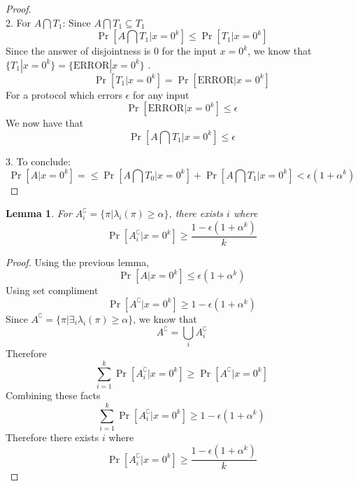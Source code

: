\documentclass{article}
\theoremstyle{plain}
\newtheorem{lemma}[theorem]{Lemma}
\begin{document}
\begin{proof}
\begin{equation*}
\end{equation*}
2. For $A \bigcap T_1$: \newline
Since $A \bigcap T_1 \subseteq T_1$
\begin{equation*}
    \Pr[A \bigcap T_1 | x = 0^k] \leq \Pr[T_1 | x = 0^k]
\end{equation*}
Since the answer of disjointness is 0 for the input $x=0^k$, we know that $\{T_1 | x=0^k\} = \{\text{ERROR} | x=0^k\}$ .
\begin{equation*}
    \Pr[T_1 | x = 0^k] = \Pr[\text{ERROR} | x = 0^k]
\end{equation*}
For a protocol which errors $\epsilon$ for any input
\begin{equation*}
    \Pr[\text{ERROR} | x = 0^k] \leq \epsilon
\end{equation*}
We now have that 
\begin{equation*}
    \Pr[A \bigcap T_1 | x = 0^k] \leq \epsilon
\end{equation*}

3. To conclude: \newline
\begin{equation*}
    \Pr[A| x = 0^k] = \leq \Pr[A \bigcap T_0 | x = 0^k] + \Pr[A \bigcap T_1 | x = 0^k] < \epsilon (1 + \alpha ^k)
\end{equation*}
\end{proof}

\begin{lemma}
    For $A_{i}^\complement = \{\pi | \lambda_i(\pi) \geq \alpha\}$, there exists $i$ where
    \begin{equation*}
    \Pr[A_{i}^\complement| x = 0^k] \geq \frac{1 - \epsilon (1 + \alpha ^k)}{k}
    \end{equation*}
\end{lemma}
\begin{proof}
Using the previous lemma,
\begin{equation*}
    \Pr[A| x = 0^k] \leq \epsilon (1 + \alpha ^k)
\end{equation*}
Using set compliment
\begin{equation*}
    \Pr[A^\complement| x = 0^k] \geq 1 - \epsilon (1 + \alpha ^k)
\end{equation*}
Since $A^\complement = \{\pi | \exists_i \lambda_i(\pi) \geq \alpha\}$, we know that 
\begin{equation*}
    A^\complement = \bigcup_{i} A_{i}^\complement
\end{equation*}
Therefore 
\begin{equation*}
     \sum_{i=1}^{k} \Pr[A_i^\complement| x = 0^k] \geq \Pr[A^\complement| x = 0^k]
\end{equation*}
Combining these facts
\begin{equation*}
    \sum_{i=1}^{k} \Pr[A_i^\complement| x = 0^k] \geq 1 - \epsilon (1 + \alpha ^k)
\end{equation*}
Therefore there exists $i$ where 
\begin{equation*}
    \Pr[A_{i}^\complement| x = 0^k] \geq \frac{1 - \epsilon (1 + \alpha ^k)}{k}
    \end{equation*}
\end{proof}
\end{document}
